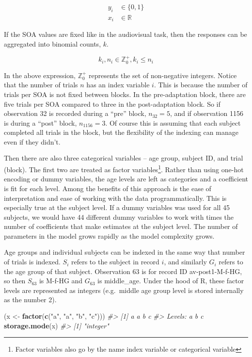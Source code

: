\documentclass[11pt, oneside, openany]{scrbook}
\newenvironment{Shaded}{\begin{snugshade}}{\end{snugshade}}
\newcommand{\CommentTok}[1]{\textcolor[rgb]{0.56,0.35,0.01}{\textit{#1}}}
\newcommand{\KeywordTok}[1]{\textcolor[rgb]{0.13,0.29,0.53}{\textbf{#1}}}
\newcommand{\NormalTok}[1]{#1}
\newcommand{\StringTok}[1]{\textcolor[rgb]{0.31,0.60,0.02}{#1}}
\begin{document}
\begin{align*}
y_i &\in \lbrace 0, 1\rbrace \\
x_i &\in \mathbb{R}
\end{align*}

If the SOA values are fixed like in the audiovisual task, then the responses can be aggregated into binomial counts, \(k\).

\[
k_i, n_i \in \mathbb{Z}_0^+, k_i \le n_i
\]

In the above expression, \(\mathbb{Z}_0^+\) represents the set of non-negative integers. Notice that the number of trials \(n\) has an index variable \(i\). This is because the number of trials per SOA is not fixed between blocks. In the pre-adaptation block, there are five trials per SOA compared to three in the post-adaptation block. So if observation 32 is recorded during a ``pre'' block, \(n_{32} = 5\), and if observation 1156 is during a ``post'' block, \(n_{1156} = 3\). Of course this is assuming that each subject completed all trials in the block, but the flexibility of the indexing can manage even if they didn't.

Then there are also three categorical variables -- age group, subject ID, and trial (block). The first two are treated as factor variables\footnote{Factor variables also go by the name index variable or categorical variable}. Rather than using one-hot encoding or dummy variables, the age levels are left as categories and a coefficient is fit for each level. Among the benefits of this approach is the ease of interpretation and ease of working with the data programmatically. This is especially true at the subject level. If a dummy variables was used for all 45 subjects, we would have 44 different dummy variables to work with times the number of coefficients that make estimates at the subject level. The number of parameters in the model grows rapidly as the model complexity grows.

Age groups and individual subjects can be indexed in the same way that number of trials is indexed. \(S_i\) refers to the subject in record \(i\), and similarly \(G_i\) refers to the age group of that subject. Observation 63 is for record ID av-post1-M-f-HG, so then \(S_{63}\) is M-f-HG and \(G_{63}\) is middle\_age. Under the hood of R, these factor levels are represented as integers (e.g.~middle age group level is stored internally as the number 2).

\begin{Shaded}
\begin{Highlighting}[]
\NormalTok{(x <-}\StringTok{ }\KeywordTok{factor}\NormalTok{(}\KeywordTok{c}\NormalTok{(}\StringTok{"a"}\NormalTok{, }\StringTok{"a"}\NormalTok{, }\StringTok{"b"}\NormalTok{, }\StringTok{"c"}\NormalTok{)))}
\CommentTok{#> [1] a a b c}
\CommentTok{#> Levels: a b c}
\KeywordTok{storage.mode}\NormalTok{(x)}
\CommentTok{#> [1] "integer"}
\end{Highlighting}
\end{Shaded}
\end{document}

